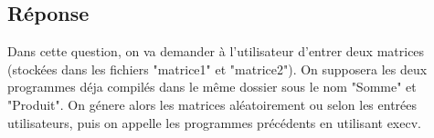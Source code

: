 \documentclass[
	12pt, %
]{fphw}
\begin{document}
\subsection*{Réponse}

Dans cette question, on va demander à l'utilisateur d'entrer deux matrices (stockées dans les fichiers "matrice1" et "matrice2"). On supposera les deux programmes déja compilés dans le même dossier sous le nom "Somme" et "Produit". On génere alors les matrices aléatoirement ou selon les entrées utilisateurs, puis on appelle les programmes précédents en utilisant execv.

%
	
\end{document}
